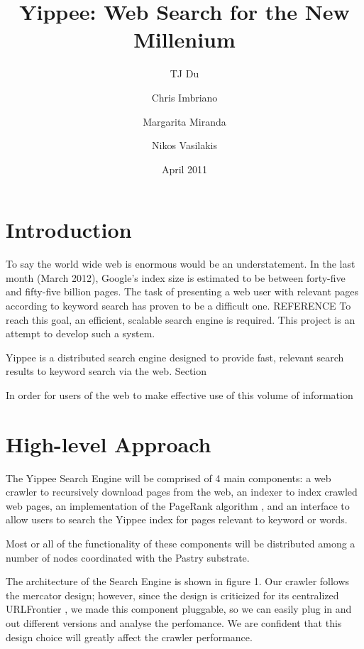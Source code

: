 \documentclass[11pt, letterpaper, oneside, twocolumn]{article}
\begin{document}
\title{Yippee: Web Search for the New Millenium}
\author{	TJ Du
	\and Chris Imbriano
	\and Margarita Miranda
	\and Nikos Vasilakis}
\date{April 2011}

\maketitle

\section{ Introduction }

To say the world wide web is enormous would be an understatement.  In the last month (March 2012),  Google's index size is estimated to be between forty-five and fifty-five billion pages. \cite{websize} The task of presenting a web user with relevant pages according to keyword search has proven to be a difficult one. \cite{}REFERENCE To reach this goal, an efficient, scalable search engine is required.  This project is an attempt to develop such a system.

Yippee is a distributed search engine designed to provide fast, relevant search results to keyword search via the web.  Section


In order for users of the web to make effective use of this volume of information 

\section{ High-level Approach }

The Yippee Search Engine will be comprised of 4 main components: a web crawler to recursively download pages from the web, an indexer to index crawled web pages, an implementation of the PageRank algorithm \cite{pagerank}, and an interface to allow users to search the Yippee index for pages relevant to keyword or words.

Most or all of the functionality of these components will be distributed among a number of nodes coordinated with the Pastry substrate. 

The architecture of the Search Engine  is shown in figure 1. Our crawler
follows the mercator design\cite{mercator}; however, since the design is
criticized for its centralized URLFrontier \cite{ubi,para}, we made this
component  pluggable,  so  we  can  easily plug  in  and  out  different
versions and analyse the perfomance. We are  confident that this design choice  will greatly affect
the crawler performance.
\end{document}
